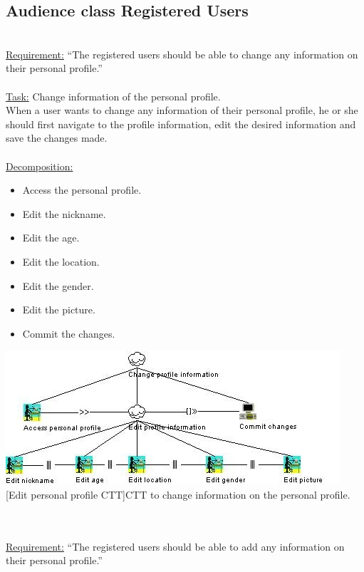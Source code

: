 \documentclass[11pt, a4paper,svglistings,oneside]{book}
\begin{document}
\subsection{Audience class Registered Users}
$\;$ \\
\underline{Requirement:} ``The registered users should be able to change any information on their personal profile.'' \\ \\
\underline{Task:} Change information of the personal profile. \\
When a user wants to change any information of their personal profile, he or she should first navigate to the profile information, edit the desired information and save the changes made. \\ \\
\underline{Decomposition:}
\begin{itemize}
\item Access the personal profile.
\item Edit the nickname.
\item Edit the age.
\item Edit the location.
\item Edit the gender.
\item Edit the picture.
\item Commit the changes.
\end{itemize}
\noindent\begin{minipage}{\textwidth}
    \centering
   \includegraphics[width=\textwidth]{CTT_Profile.png}
 [Edit personal profile CTT]{CTT to change information on the personal profile.}
\end{minipage}
$\;$ \\ \\
\underline{Requirement:} ``The registered users should be able to add any information on their personal profile.'' \\ \\
\end{document}
